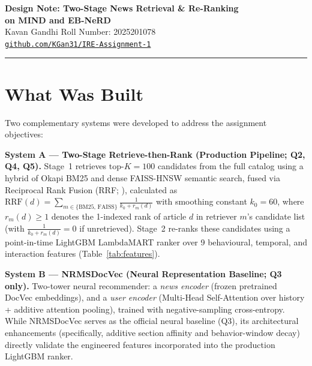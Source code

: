 \documentclass[11pt,a4paper]{article}
\begin{document}
\begin{center}
  {\Large\bfseries Design Note: Two-Stage News Retrieval \& Re-Ranking\\[2pt]
  on MIND and EB-NeRD}\\[6pt]
  {\normalsize Kavan Gandhi \quad Roll Number: 2025201078}\\[2pt]
  {\normalsize \href{https://github.com/KGan31/IRE-Assignment-1}{\texttt{github.com/KGan31/IRE-Assignment-1}}}\\[2pt]
\end{center}
\vspace{4pt}\hrule\vspace{6pt}

\section{What Was Built}

Two complementary systems were developed to address the assignment objectives:

\textbf{System A --- Two-Stage Retrieve-then-Rank (Production Pipeline; Q2, Q4, Q5).}
Stage~1 retrieves $\text{top-}K{=}100$ candidates from the full catalog using a hybrid of Okapi BM25 and dense FAISS-HNSW semantic search, fused via Reciprocal Rank Fusion (RRF; \cite{cormack2009rrf}), calculated as $\text{RRF}(d) = \sum_{m \in \{\text{BM25},\,\text{FAISS}\}} \frac{1}{k_0 + r_m(d)}$ with smoothing constant $k_0 = 60$, where $r_m(d) \ge 1$ denotes the 1-indexed rank of article $d$ in retriever $m$'s candidate list (with $\frac{1}{k_0 + r_m(d)} = 0$ if unretrieved). Stage~2 re-ranks these candidates using a point-in-time LightGBM LambdaMART ranker over 9 behavioural, temporal, and interaction features (Table~\ref{tab:features}).

\textbf{System B --- NRMSDocVec (Neural Representation Baseline; Q3 only).}
Two-tower neural recommender: a \emph{news encoder} (frozen pretrained DocVec embeddings), and a \emph{user encoder} (Multi-Head Self-Attention over history + additive attention pooling), trained with negative-sampling cross-entropy. While NRMSDocVec serves as the official neural baseline (Q3), its architectural enhancements (specifically, additive section affinity and behavior-window decay) directly validate the engineered features incorporated into the production LightGBM ranker.
\end{document}
